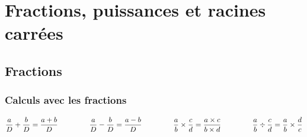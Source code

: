 \chapter{Fractions, puissances et racines carrées}

\section{Fractions}

\subsection{Calculs avec les fractions}

\begin{prop}

	\[
		\frac{a}{D} + \frac{b}{D} = \frac{a + b}{D} \hspace{1.5cm} \frac{a}{D} - \frac{b}{D} = \frac{a - b}{D} \hspace{1.5cm} \frac{a}{b} \times \frac{c}{d} = \frac{a \times c}{b \times d} \hspace{1.5cm} \frac{a}{b} \div \frac{c}{d} = \frac{a}{b} \times \frac{d}{c}
	\]

\end{prop}

